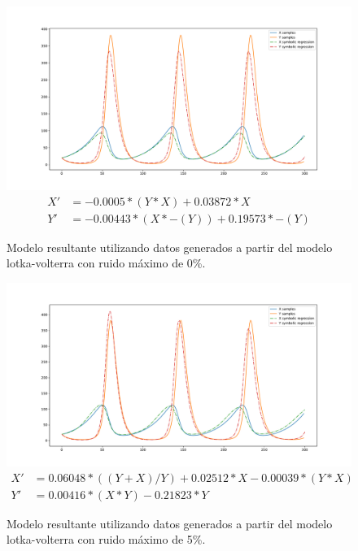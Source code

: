 \begin{figure}[h]
    \centering
    \includegraphics[width=\textwidth]{"figures/final_plot_LV_0.0.pdf"}
    \begin{align*}
        X' & = -0.0005 * (Y * X) + 0.03872 * X        \\
        Y' & = -0.00443 * (X * -(Y)) + 0.19573 * -(Y)
    \end{align*}
    \caption{Modelo resultante utilizando datos generados a partir del modelo lotka-volterra con ruido máximo de 0\%.
    }
    \label{fig:final_plot_LV_0.0}
\end{figure}

\begin{figure}[h]
    \centering
    \includegraphics[width=\textwidth]{"figures/final_plot_LV_0.05.pdf"}
    \begin{align*}
        X' & = 0.06048 * ((Y + X) / Y) + 0.02512 * X -0.00039 * (Y * X) \\
        Y' & = 0.00416 * (X * Y) -0.21823 * Y
    \end{align*}
    \caption{Modelo resultante utilizando datos generados a partir del modelo lotka-volterra con ruido máximo de 5\%.}
    \label{fig:final_plot_LV_0.05}
\end{figure}

